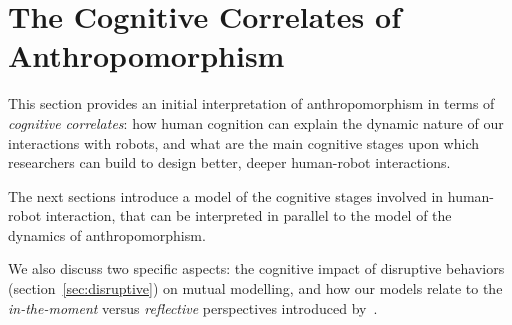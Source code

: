 \documentclass{frontiersSCNS} %
\begin{document}
\section{The Cognitive Correlates of Anthropomorphism}
\label{sec:cognition-neuroscience}

This section provides an initial interpretation of anthropomorphism in
terms of \emph{cognitive correlates}: how human cognition can explain the
dynamic nature of our interactions with robots, and what are the main cognitive
stages upon which researchers can build to design better, deeper human-robot
interactions.

The next sections introduce a model of the cognitive stages involved in
human-robot interaction, that can be interpreted in parallel to the model of the
dynamics of anthropomorphism.

We also discuss two specific aspects: the cognitive impact of disruptive
behaviors (section~\ref{sec:disruptive}) on mutual modelling, and how our models
relate to the \emph{in-the-moment} versus \emph{reflective} perspectives
introduced by~\citet{takayama_perspectives_2012}.

%


\end{document}
